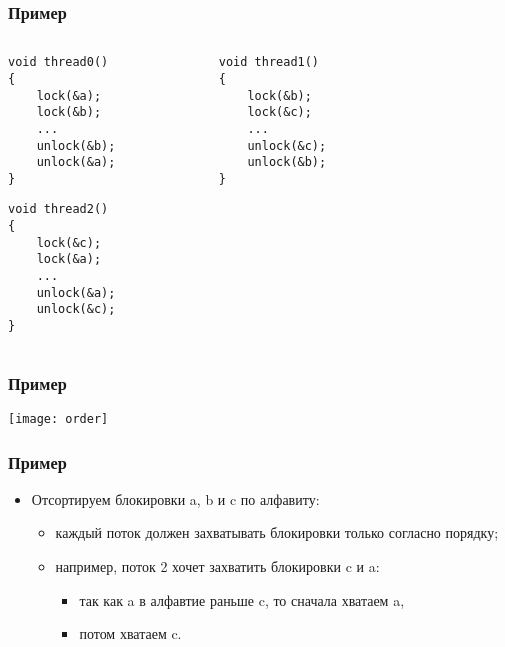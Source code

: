 \begin{frame}[fragile]
\frametitle{Пример}
\begin{columns}
    \begin{column}{.35\linewidth}
        \begin{lstlisting}
void thread0()
{
    lock(&a);
    lock(&b);
    ...
    unlock(&b);
    unlock(&a);
}
        \end{lstlisting}
        \begin{lstlisting}
void thread2()
{
    lock(&c);
    lock(&a);
    ...
    unlock(&a);
    unlock(&c);
}
        \end{lstlisting}
    \end{column}
    \begin{column}{.35\linewidth}
        \begin{lstlisting}
void thread1()
{
    lock(&b);
    lock(&c);
    ...
    unlock(&c);
    unlock(&b);
}
        \end{lstlisting}
    \end{column}
    \begin{column}{.3\linewidth}
    \end{column}
\end{columns}
\end{frame}

\begin{frame}
\frametitle{Пример}
\texttt{[image: order]}
\end{frame}

\begin{frame}
\frametitle{Пример}
\begin{itemize}
    \item<1->Отсортируем блокировки a, b и c по алфавиту:
    \begin{itemize}
        \item<2->каждый поток должен захватывать блокировки только согласно
             порядку;
        \item<3->например, поток 2 хочет захватить блокировки c и a:
        \begin{itemize}
            \item<4->так как a в алфавтие раньше c, то сначала хватаем a,
            \item<5->потом хватаем c.
        \end{itemize}
    \end{itemize}
\end{itemize}
\end{frame}

